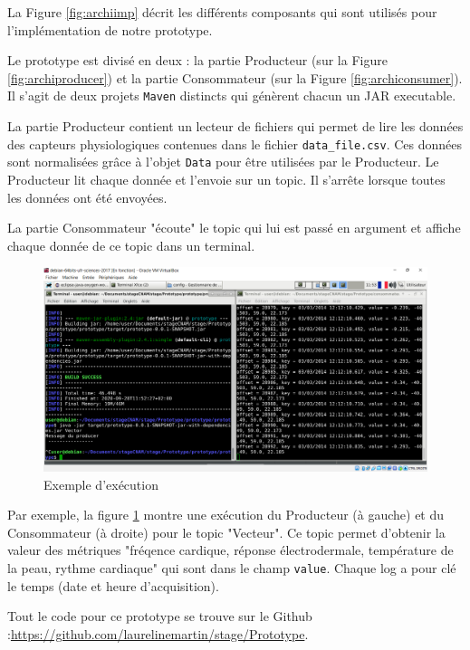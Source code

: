 \documentclass[11pt]{article}
\begin{document}
			La Figure \ref{fig:archiimp} décrit les différents composants qui sont utilisés pour l'implémentation de notre prototype.\par
			Le prototype est divisé en deux :
			la partie Producteur (sur la Figure \ref{fig:archiproducer}) et la partie Consommateur (sur la Figure \ref{fig:archiconsumer}). 
			Il s'agit de deux projets \texttt{Maven} distincts qui génèrent chacun un JAR executable.\par
			La partie Producteur contient un lecteur de fichiers qui permet de lire les données des capteurs physiologiques contenues dans le fichier \texttt{data\_file.csv}. 
			Ces données sont normalisées grâce à l'objet \texttt{Data} pour être utilisées par le Producteur.
			Le Producteur lit chaque donnée et l'envoie sur un topic.
			Il s'arrête lorsque toutes les données ont été envoyées.\par
			La partie Consommateur "écoute" le topic qui lui est passé en argument et affiche chaque donnée de ce topic dans un terminal.\par
			\begin{figure}
				\hspace*{-0.7cm}
				\includegraphics[scale=0.5]{../include/producteurConsommateur.PNG}
				\caption{Exemple d'exécution}
				\label{fig:exemple}
			\end{figure}
			Par exemple, la figure \ref{fig:exemple} montre une exécution du Producteur (à gauche) et du Consommateur (à droite) pour le topic "Vecteur".
			Ce topic permet d'obtenir la valeur des métriques "fréqence cardique, réponse électrodermale, température de la peau, rythme cardiaque" qui sont dans le champ \texttt{value}.
			Chaque log a pour clé le temps (date et heure d'acquisition).\par
			Tout le code pour ce prototype se trouve sur le Github :\newline \href{https://github.com/laurelinemartin/stage/Prototype}{https://github.com/laurelinemartin/stage/Prototype}.
\end{document}
